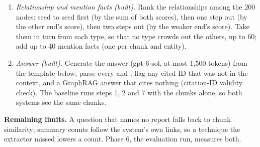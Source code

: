 \documentclass[10pt]{article}
\begin{document}
\begin{enumerate}
\item \emph{Relationship and mention facts (built).} Rank the relationships among the 200 nodes: seed to seed first (by the sum of both scores), then one step out (by the other end's score), then two steps out (by the weaker end's score). Take them in turn from each type, so that no type crowds out the others, up to 60; add up to 40 mention facts (one per chunk and entity).
\item \emph{Answer (built).} Generate the answer (gpt-6-sol, at most 1,500 tokens) from the template below; parse every  and ; flag any cited ID that was not in the context, and a GraphRAG answer that cites nothing (citation-ID validity check). The baseline runs steps 1, 2 and 7 with the chunks alone, so both systems see the same chunks.
\end{enumerate}
\textbf{Remaining limits.} A question that names no report falls back to chunk similarity; summary counts follow the system's own links, so a technique the extractor missed lowers a count. Phase 6, the evaluation run, measures both.
\end{document}
